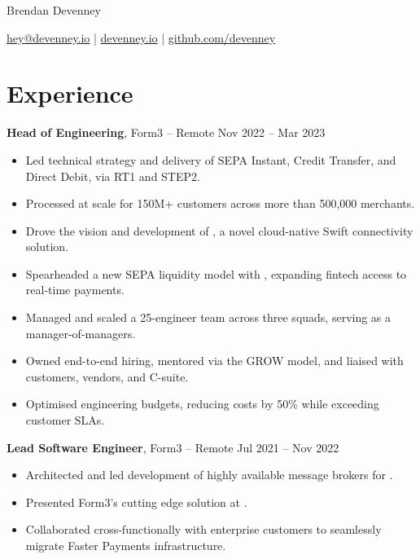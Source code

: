 \documentclass[11pt]{article}       %
\begin{document}
\centerline{\Huge Brendan Devenney}

\vspace{5pt}

\centerline{\href{mailto:hey@devenney.io}{hey@devenney.io} | \href{https://devenney.io}{devenney.io} | \href{https://github.com/devenney}{github.com/devenney}}

\vspace{-10pt}

\section*{Experience}

\textbf{Head of Engineering}, Form3 -- Remote \hfill Nov 2022 -- Mar 2023 \\
\vspace{-9pt}
\begin{itemize}
  \item Led technical strategy and delivery of SEPA Instant, Credit Transfer, and Direct Debit, via RT1 and STEP2. \\
  \item Processed  at scale for 150M+ customers across more than 500,000 merchants. \\
  \item Drove the vision and development of , a novel cloud-native Swift connectivity solution. \\
  \item Spearheaded a new SEPA liquidity model with , expanding fintech access to real-time payments. \\
  \item Managed and scaled a 25-engineer team across three squads, serving as a manager-of-managers. \\
  \item Owned end-to-end hiring, mentored via the GROW model, and liaised with customers, vendors, and C-suite. \\
  \item Optimised engineering budgets, reducing costs by 50\% while exceeding customer SLAs. \\
\end{itemize}

\textbf{Lead Software Engineer}, Form3 -- Remote \hfill Jul 2021 -- Nov 2022 \\
\vspace{-9pt}
\begin{itemize}
  \item Architected and led development of highly available message brokers for . \\
  \item Presented Form3's cutting edge solution at . \\
  \item Collaborated cross-functionally with enterprise customers to seamlessly migrate Faster Payments infrastructure. \\
\end{itemize}
\end{document}
